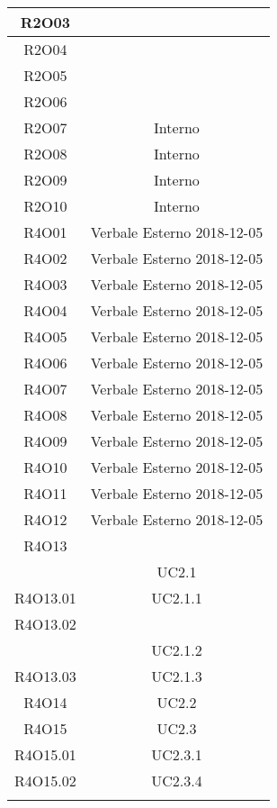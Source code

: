 \begin{tabularx}{\textwidth}{|C|C|}
	\hline
	R2O03&\\
	\hline
	R2O04&\\
	\hline
	R2O05&\\
	\hline
	R2O06&\\
	\hline
	R2O07&Interno\\
	\hline
	R2O08&Interno\\
	\hline
	R2O09&Interno\\
	\hline
	R2O10&Interno\\
	\hline
	R4O01&Verbale Esterno 2018-12-05\\
	\hline
	R4O02&Verbale Esterno 2018-12-05\\
	\hline
	R4O03&Verbale Esterno 2018-12-05\\
	\hline
	R4O04&Verbale Esterno 2018-12-05\\
	\hline
	R4O05&Verbale Esterno 2018-12-05\\
	\hline
	R4O06&Verbale Esterno 2018-12-05\\
	\hline
	R4O07&Verbale Esterno 2018-12-05\\
	\hline
	R4O08&Verbale Esterno 2018-12-05\\
	\hline
	R4O09&Verbale Esterno 2018-12-05\\
	\hline
	R4O10&Verbale Esterno 2018-12-05\\
	\hline
	R4O11&Verbale Esterno 2018-12-05\\
	\hline
	R4O12&Verbale Esterno 2018-12-05\\
	\hline
	R4O13&\\& UC2.1\\
	\hline
	R4O13.01& UC2.1.1\\
	\hline
	R4O13.02&\\& UC2.1.2\\
	\hline
	R4O13.03&UC2.1.3\\
	\hline
	R4O14&UC2.2\\
	\hline
	R4O15&UC2.3\\
	\hline
	R4O15.01&UC2.3.1\\
	\hline
	R4O15.02&UC2.3.4\\
	\hline
	\caption{Tabella requisiti-fonti}
\end{tabularx}